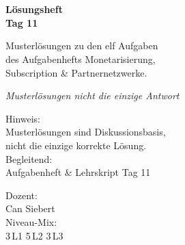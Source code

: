 \documentclass[11pt,a4paper,oneside]{article}
\newcommand{\caveatfontfallback}{\itshape}
\newcommand\caveatfont{\caveatfontfallback}%
\begin{document}
\begin{titlepage}
  \pagestyle{empty}
  \vspace*{1.5cm}
  \\[2pt]
  \noindent{\color{lpAccent}\rule{\linewidth}{1.2pt}}\\[4pt]

  \vspace{3cm}
  {\sffamily\fontsize{30}{34}\selectfont\bfseries\color{lpInk}Lösungsheft\\Tag 11\par}

  \vspace{0.7cm}
  {\sffamily\large\color{lpGray}Musterlösungen zu den elf Aufgaben\\des Aufgabenhefts \textendash{} Monetarisierung,\\Subscription \& Partnernetzwerke.\par}

  \vspace{1.5cm}
  {\caveatfont\LARGE\color{lpGreen}Musterlösungen \textperiodcentered{} nicht die einzige Antwort}\par

  \vfill

  \noindent\begin{minipage}{0.55\linewidth}
    {\sffamily\footnotesize\color{lpGray}Hinweis:}\\
    {\sffamily\small\color{lpInk}Musterlösungen sind Diskussionsbasis,\\nicht die einzige korrekte Lösung.}\\[10pt]
    {\sffamily\footnotesize\color{lpGray}Begleitend:}\\
    {\sffamily\small\color{lpInk}Aufgabenheft \& Lehrskript Tag 11}
  \end{minipage}\hfill
  \begin{minipage}{0.4\linewidth}
    \raggedleft
    {\sffamily\footnotesize\color{lpGray}Dozent:}\\
    {\sffamily\small\color{lpInk}Can Siebert}\\[10pt]
    {\sffamily\footnotesize\color{lpGray}Niveau-Mix:}\\
    {\sffamily\small\color{lpInk}3\,L1 \textperiodcentered{} 5\,L2 \textperiodcentered{} 3\,L3}
  \end{minipage}

  \vspace{0.5cm}
  \noindent{\color{lpAccent}\rule{\linewidth}{0.6pt}}
\end{titlepage}
\end{document}
